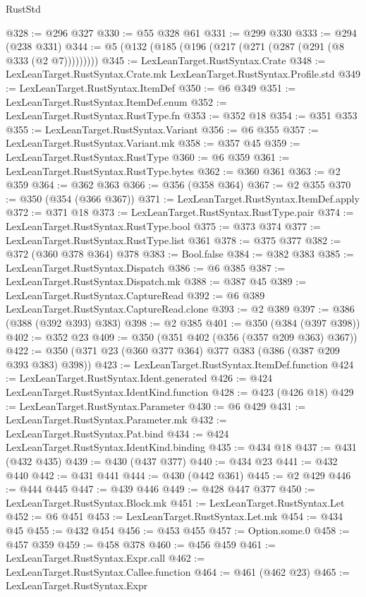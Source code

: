 \begin{lexlean}{RustStd}
\begin{coremodule}
@328 := @296 @327
@330 := @55 @328 @61
@331 := @299 @330
@333 := @294 (@238 @331)
@344 := @5 (@132 (@185 (@196 (@217 (@271 (@287 (@291 (@8 @333 (@2 @7)))))))))
@345 := LexLeanTarget.RustSyntax.Crate
@348 := LexLeanTarget.RustSyntax.Crate.mk LexLeanTarget.RustSyntax.Profile.std
@349 := LexLeanTarget.RustSyntax.ItemDef
@350 := @6 @349
@351 := LexLeanTarget.RustSyntax.ItemDef.enum
@352 := LexLeanTarget.RustSyntax.RustType.fn
@353 := @352 @18
@354 := @351 @353
@355 := LexLeanTarget.RustSyntax.Variant
@356 := @6 @355
@357 := LexLeanTarget.RustSyntax.Variant.mk
@358 := @357 @45
@359 := LexLeanTarget.RustSyntax.RustType
@360 := @6 @359
@361 := LexLeanTarget.RustSyntax.RustType.bytes
@362 := @360 @361
@363 := @2 @359
@364 := @362 @363
@366 := @356 (@358 @364)
@367 := @2 @355
@370 := @350 (@354 (@366 @367))
@371 := LexLeanTarget.RustSyntax.ItemDef.apply
@372 := @371 @18
@373 := LexLeanTarget.RustSyntax.RustType.pair
@374 := LexLeanTarget.RustSyntax.RustType.bool
@375 := @373 @374
@377 := LexLeanTarget.RustSyntax.RustType.list @361
@378 := @375 @377
@382 := @372 (@360 @378 @364) @378
@383 := Bool.false
@384 := @382 @383
@385 := LexLeanTarget.RustSyntax.Dispatch
@386 := @6 @385
@387 := LexLeanTarget.RustSyntax.Dispatch.mk
@388 := @387 @45
@389 := LexLeanTarget.RustSyntax.CaptureRead
@392 := @6 @389 LexLeanTarget.RustSyntax.CaptureRead.clone
@393 := @2 @389
@397 := @386 (@388 (@392 @393) @383)
@398 := @2 @385
@401 := @350 (@384 (@397 @398))
@402 := @352 @23
@409 := @350 (@351 @402 (@356 (@357 @209 @363) @367))
@422 := @350 (@371 @23 (@360 @377 @364) @377 @383 (@386 (@387 @209 @393 @383) @398))
@423 := LexLeanTarget.RustSyntax.ItemDef.function
@424 := LexLeanTarget.RustSyntax.Ident.generated
@426 := @424 LexLeanTarget.RustSyntax.IdentKind.function
@428 := @423 (@426 @18)
@429 := LexLeanTarget.RustSyntax.Parameter
@430 := @6 @429
@431 := LexLeanTarget.RustSyntax.Parameter.mk
@432 := LexLeanTarget.RustSyntax.Pat.bind
@434 := @424 LexLeanTarget.RustSyntax.IdentKind.binding
@435 := @434 @18
@437 := @431 (@432 @435)
@439 := @430 (@437 @377)
@440 := @434 @23
@441 := @432 @440
@442 := @431 @441
@444 := @430 (@442 @361)
@445 := @2 @429
@446 := @444 @445
@447 := @439 @446
@449 := @428 @447 @377
@450 := LexLeanTarget.RustSyntax.Block.mk
@451 := LexLeanTarget.RustSyntax.Let
@452 := @6 @451
@453 := LexLeanTarget.RustSyntax.Let.mk
@454 := @434 @45
@455 := @432 @454
@456 := @453 @455
@457 := Option.some.{0}
@458 := @457 @359
@459 := @458 @378
@460 := @456 @459
@461 := LexLeanTarget.RustSyntax.Expr.call
@462 := LexLeanTarget.RustSyntax.Callee.function
@464 := @461 (@462 @23)
@465 := LexLeanTarget.RustSyntax.Expr

\end{coremodule}
\end{lexlean}
